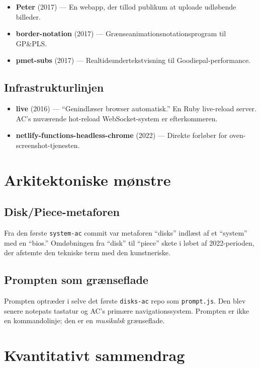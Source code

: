 \documentclass[10pt,letterpaper,twocolumn]{article}
\begin{document}
\begin{itemize}
  \item \textbf{Peter} (2017) --- En webapp, der tillod publikum at uploade udløbende billeder.
  \item \textbf{border-notation} (2017) --- Grænseanimationsnotationsprogram til GP\&PLS.
  \item \textbf{pmet-subs} (2017) --- Realtidsundertekstvisning til Goodiepal-performance.
\end{itemize}

\subsection{Infrastrukturlinjen}

\begin{itemize}
  \item \textbf{live} (2016) --- ``Genindlæser browser automatisk.'' En Ruby live-reload server. AC's nuværende hot-reload WebSocket-system er efterkommeren.
  \item \textbf{netlify-functions-headless-chrome} (2022) --- Direkte forløber for oven-screenshot-tjenesten.
\end{itemize}

\section{Arkitektoniske mønstre}

\subsection{Disk/Piece-metaforen}

Fra den første \texttt{system-ac} commit var metaforen ``disks'' indlæst af et ``system'' med en ``bios.'' Omdøbningen fra ``disk'' til ``piece'' skete i løbet af 2022-perioden, der afstemte den tekniske term med den kunstneriske.

\subsection{Prompten som grænseflade}

Prompten optræder i selve det første \texttt{disks-ac} repo som \texttt{prompt.js}. Den blev senere notepats tastatur og AC's primære navigationssystem. Prompten er ikke en kommandolinje; den er en \emph{musikalsk} grænseflade.

\section{Kvantitativt sammendrag}
\end{document}

